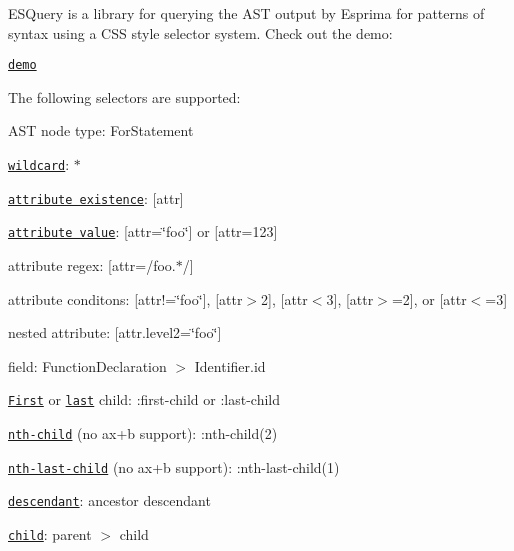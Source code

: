 E\+S\+Query is a library for querying the A\+ST output by Esprima for patterns of syntax using a C\+SS style selector system. Check out the demo\+:

\href{https://estools.github.io/esquery/}{\tt demo}

The following selectors are supported\+:
\begin{DoxyItemize}
\item A\+ST node type\+: {\ttfamily For\+Statement}
\item \href{http://dev.w3.org/csswg/selectors4/#universal-selector}{\tt wildcard}\+: {\ttfamily $\ast$}
\item \href{http://dev.w3.org/csswg/selectors4/#attribute-selectors}{\tt attribute existence}\+: {\ttfamily \mbox{[}attr\mbox{]}}
\item \href{http://dev.w3.org/csswg/selectors4/#attribute-selectors}{\tt attribute value}\+: {\ttfamily \mbox{[}attr=\char`\"{}foo\char`\"{}\mbox{]}} or {\ttfamily \mbox{[}attr=123\mbox{]}}
\item attribute regex\+: {\ttfamily \mbox{[}attr=/foo.$\ast$/\mbox{]}}
\item attribute conditons\+: {\ttfamily \mbox{[}attr!=\char`\"{}foo\char`\"{}\mbox{]}}, {\ttfamily \mbox{[}attr$>$2\mbox{]}}, {\ttfamily \mbox{[}attr$<$3\mbox{]}}, {\ttfamily \mbox{[}attr$>$=2\mbox{]}}, or {\ttfamily \mbox{[}attr$<$=3\mbox{]}}
\item nested attribute\+: {\ttfamily \mbox{[}attr.\+level2=\char`\"{}foo\char`\"{}\mbox{]}}
\item field\+: {\ttfamily Function\+Declaration $>$ Identifier.\+id}
\item \href{http://dev.w3.org/csswg/selectors4/#the-first-child-pseudo}{\tt First} or \href{http://dev.w3.org/csswg/selectors4/#the-last-child-pseudo}{\tt last} child\+: {\ttfamily \+:first-\/child} or {\ttfamily \+:last-\/child}
\item \href{http://dev.w3.org/csswg/selectors4/#the-nth-child-pseudo}{\tt nth-\/child} (no ax+b support)\+: {\ttfamily \+:nth-\/child(2)}
\item \href{http://dev.w3.org/csswg/selectors4/#the-nth-last-child-pseudo}{\tt nth-\/last-\/child} (no ax+b support)\+: {\ttfamily \+:nth-\/last-\/child(1)}
\item \href{http://dev.w3.org/csswg/selectors4/#descendant-combinators}{\tt descendant}\+: {\ttfamily ancestor descendant}
\item \href{http://dev.w3.org/csswg/selectors4/#child-combinators}{\tt child}\+: {\ttfamily parent $>$ child}

\end{DoxyItemize}
